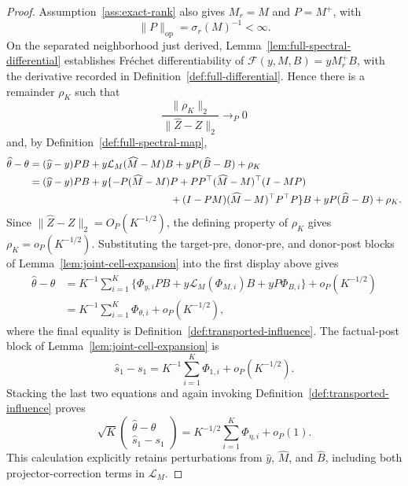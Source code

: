 \documentclass{article}
\begin{document}
\begin{proof}
Assumption~\ref{ass:exact-rank} also gives \(M_r=M\) and \(P=M^+\), with
\[
 \|P\|_{\mathrm{op}}=\sigma_r(M)^{-1}<\infty.
\]
On the separated neighborhood just derived, Lemma~\ref{lem:full-spectral-differential} establishes Fr\'echet differentiability of \(\mathcal F(y,M,B)=yM_r^+B\), with the derivative recorded in Definition~\ref{def:full-differential}. Hence there is a remainder \(\rho_K\) such that
\[
 \frac{\|\rho_K\|_2}{\|\widehat Z-Z\|_2}\to_P0
\]
and, by Definition~\ref{def:full-spectral-map},
\[
\begin{aligned}
 \widehat\theta-\theta
 &=(\widehat y-y)PB
   +y\mathcal L_M(\widehat M-M)B
   +yP(\widehat B-B)+\rho_K\\
 &=(\widehat y-y)PB
   +y\{-P(\widehat M-M)P
      +PP^\top(\widehat M-M)^\top(I-MP)\\
 &\hspace{4.9cm}
      +(I-PM)(\widehat M-M)^\top P^\top P\}B
   +yP(\widehat B-B)+\rho_K.
\end{aligned}
\]
Since \(\|\widehat Z-Z\|_2=O_P(K^{-1/2})\), the defining property of \(\rho_K\) gives \(\rho_K=o_P(K^{-1/2})\). Substituting the target-pre, donor-pre, and donor-post blocks of Lemma~\ref{lem:joint-cell-expansion} into the first display above gives
\[
\begin{aligned}
 \widehat\theta-\theta
 &=K^{-1}\sum_{i=1}^K
 \{\Phi_{y,i}PB+y\mathcal L_M(\Phi_{M,i})B+yP\Phi_{B,i}\}
 +o_P(K^{-1/2})\\
 &=K^{-1}\sum_{i=1}^K\Phi_{\theta,i}+o_P(K^{-1/2}),
\end{aligned}
\]
where the final equality is Definition~\ref{def:transported-influence}. The factual-post block of Lemma~\ref{lem:joint-cell-expansion} is
\[
 \widehat s_1-s_1
 =K^{-1}\sum_{i=1}^K\Phi_{1,i}+o_P(K^{-1/2}).
\]
Stacking the last two equations and again invoking Definition~\ref{def:transported-influence} proves
\[
 \sqrt K
 \begin{pmatrix}
  \widehat\theta-\theta\\
  \widehat s_1-s_1
 \end{pmatrix}
 =K^{-1/2}\sum_{i=1}^K\Phi_{\eta,i}+o_P(1).
\]
This calculation explicitly retains perturbations from \(\widehat y\), \(\widehat M\), and \(\widehat B\), including both projector-correction terms in \(\mathcal L_M\).


\end{proof}
\end{document}
